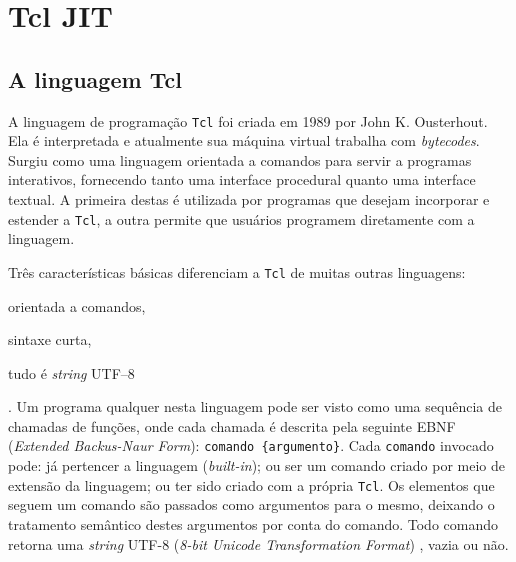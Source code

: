 \chapter{Tcl JIT}
\label{tcljit}




\section{A linguagem Tcl}


A linguagem de programação \texttt{Tcl} foi criada em 1989 por John
K. Ousterhout. Ela é interpretada e atualmente sua máquina virtual
trabalha com \textit{bytecodes}. Surgiu como uma linguagem orientada a
comandos para servir a programas interativos, fornecendo tanto uma
interface procedural quanto uma interface textual. A primeira destas é
utilizada por programas que desejam incorporar e estender a
\texttt{Tcl}, a outra permite que usuários programem diretamente com a
linguagem.

Três características básicas diferenciam a \texttt{Tcl} de muitas
outras linguagens: \begin{inparaenum}
\item orientada a comandos, \item sintaxe curta, \item tudo é
  \textit{string} UTF--8\end{inparaenum}. Um programa qualquer nesta
linguagem pode ser visto como uma sequência de chamadas de funções, onde
cada chamada é descrita pela seguinte EBNF (\textit{Extended
  Backus-Naur Form}): %
\verb!comando {argumento}!. Cada \verb!comando! invocado pode: já
pertencer a linguagem (\textit{built-in}); ou
ser um comando criado por meio de extensão da linguagem; ou ter
sido criado com a própria \texttt{Tcl}. Os elementos que seguem um comando
são passados como argumentos para o mesmo, deixando o tratamento
semântico destes argumentos por conta do comando. Todo comando retorna uma
\textit{string} UTF-8 (\textit{8-bit Unicode Transformation Format})
 , vazia ou não.

